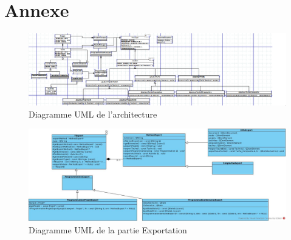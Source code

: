 \chapter{Annexe}

\begin{figure}[h]
   \includegraphics{ressources/UML.PNG}
   \caption{\label{Annexe 1} Diagramme UML de l'architecture}
\end{figure}

\begin{figure}
	\includegraphics[scale=0.5]{ressources/ExportClasses.jpg}
	\caption{\label{Annexe2} Diagramme UML de la partie Exportation}
\end{figure}